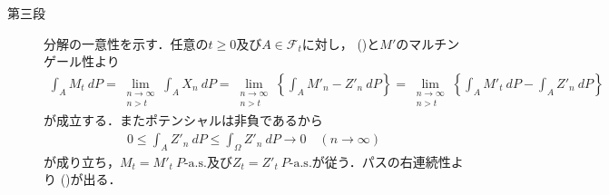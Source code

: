 \begin{prf}
\begin{description}
			\item[第三段]
				分解の一意性を示す．任意の$t \geq 0$及び$A \in \mathscr{F}_t$に対し，
				()と$M'$のマルチンゲール性より
				\begin{align}
					\int_A M_t\ dP
					= \lim_{\substack{n \to \infty \\ n > t}} \int_A X_n\ dP
					= \lim_{\substack{n \to \infty \\ n > t}} \left\{ \int_A M'_n - Z'_n\ dP \right\}
					= \lim_{\substack{n \to \infty \\ n > t}} \left\{ \int_A M'_t\ dP - \int_A Z'_n\ dP \right\}
				\end{align}
				が成立する．またポテンシャルは非負であるから
				\begin{align}
					0 \leq \int_A Z'_n\ dP \leq \int_\Omega Z'_n\ dP \longrightarrow 0
					\quad (n \longrightarrow \infty)
				\end{align}
				が成り立ち，$M_t = M'_t\ \mbox{$P$-a.s.}$及び$Z_t = Z'_t\ \mbox{$P$-a.s.}$が従う．パスの右連続性より
				()が出る．
 				\QED
 		\end{description}
 	\end{prf}
	
